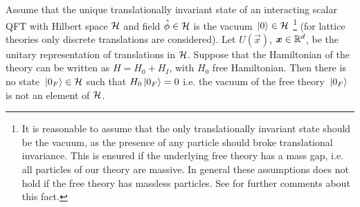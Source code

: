 \documentclass[../main/main.tex]{subfiles}
\begin{document}
\begin{theorem}
	Assume that the unique translationally invariant state of an interacting scalar QFT with Hilbert space $\mathcal H$ and field $\hat{\phi}\in\mathcal H$ is the vacuum $\,\vert0\rangle\in\mathcal H$ \footnote{It is reasonable to assume that the only translationally invariant state should be the vacuum, as the presence of any particle should broke translational invariance. This is ensured if the underlying free theory has a mass gap, i.e. all particles of our theory are massive. In general these assumptions does not hold if the free theory has massless particles. See \cite[Section 3]{Earman:2005} for further comments about this fact.} (for lattice theories only discrete translations are considered).  Let $U(\vec x)$, $\boldsymbol x\in\mathbb{R}^d$, be the unitary representation of translations in $\mathcal H$. Suppose that the Hamiltonian of the theory can be written as $H=H_0+H_I$, with $H_0$ free Hamiltonian. Then there is no state $\,\vert0_F\rangle\in\mathcal H$ such that $H_0\,\vert0_F\rangle=0$ i.e. the vacuum of the free theory $\,\vert0_F\rangle$ is not an element of $\mathcal H$.
\end{theorem}
\end{document}
